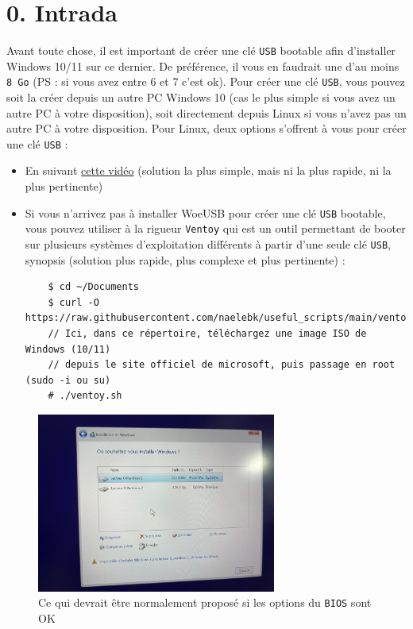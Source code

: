 \documentclass[french, a4paper, 11pt]{article}
\begin{document}
\section*{0. Intrada}
\noindent Avant toute chose, il est important de créer une clé \texttt{USB} bootable afin d'installer Windows 10/11 sur ce dernier. De préférence, il vous en faudrait une d'au moins \texttt{8 Go} (PS : si vous avez entre 6 et 7 c'est ok). Pour créer une clé \texttt{USB}, vous pouvez soit la créer depuis un autre PC Windows 10 (cas le plus simple si vous avez un autre PC à votre disposition), soit directement depuis Linux si vous n'avez pas un autre PC à votre disposition. Pour Linux, deux options s'offrent à vous pour créer une clé \texttt{USB} : 
\begin{itemize}
    \item En suivant \href{https://www.youtube.com/watch?v=FQl0nLe4erw&ab_channel=Na\%C3\%ABlEBK}{\color{blue} cette vidéo} (solution la plus simple, mais ni la plus rapide, ni la plus pertinente)
    \item Si vous n'arrivez pas à installer WoeUSB pour créer une clé \texttt{USB} bootable, vous pouvez utiliser à la rigueur \texttt{Ventoy} qui est un outil permettant de booter sur plusieurs systèmes d'exploitation différents à partir d'une seule clé \texttt{USB}, synopsis (solution plus rapide, plus complexe et plus pertinente) : \begin{verbatim}
    $ cd ~/Documents
    $ curl -O https://raw.githubusercontent.com/naelebk/useful_scripts/main/ventoy.sh
    // Ici, dans ce répertoire, téléchargez une image ISO de Windows (10/11) 
    // depuis le site officiel de microsoft, puis passage en root (sudo -i ou su)
    # ./ventoy.sh
    \end{verbatim}
\end{itemize}
\begin{figure}
  \centering
  \includegraphics[width=0.7\textwidth]{disques.jpg}
  \caption{Ce qui devrait être normalement proposé si les options du \texttt{BIOS} sont OK}
  \label{fig:disquesOK}
\end{figure}
\end{document}
